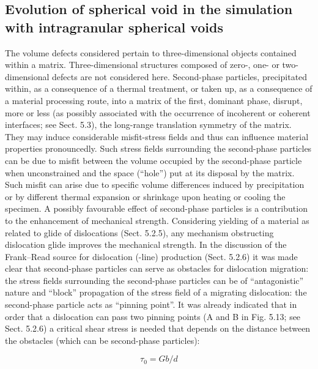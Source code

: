 \documentclass[journal,article,submit,moreauthors,pdftex,10pt,a4paper]{Definitions/mdpi}
\begin{document}
\subsection{Evolution of spherical void in the simulation with intragranular spherical voids}
The volume defects considered pertain to three-dimensional objects contained within a matrix. Three-dimensional structures composed of zero-, one- or two-dimensional defects are not considered here.
Second-phase particles, precipitated within, as a consequence of a thermal treatment, or taken up, as a consequence of a material processing route, into a matrix of the first, dominant phase, disrupt, more or less (as possibly associated with
the occurrence of incoherent or coherent interfaces; see Sect. 5.3), the long-range translation symmetry of the matrix. They may induce considerable misfit-stress fields and thus can influence material properties pronouncedly. Such stress fields surrounding the second-phase particles can be due to misfit between the volume occupied by the second-phase particle when unconstrained and the space (“hole”) put at its disposal by the matrix. Such misfit can arise due to specific volume differences induced by precipitation or by different thermal expansion or shrinkage upon heating
or cooling the specimen.
A possibly favourable effect of second-phase particles is a contribution to the enhancement of mechanical strength. Considering yielding of a material as related to glide of dislocations (Sect. 5.2.5), any mechanism obstructing dislocation glide improves the mechanical strength. In the discussion of the Frank–Read source for dislocation (-line) production (Sect. 5.2.6) it was made clear that second-phase particles can serve as obstacles for dislocation migration: the stress fields surrounding the second-phase particles can be of “antagonistic” nature and “block” propagation of the stress field of a migrating dislocation: the second-phase particle acts as “pinning point”. It was already indicated that in order that a dislocation can pass two pinning points (A and B in Fig. 5.13; see Sect. 5.2.6) a critical shear stress is needed
that depends on the distance between the obstacles (which can be second-phase particles):

\begin{equation} \label{eq:orowan} 
\tau_0 = Gb/d
\end{equation}
\end{document}
